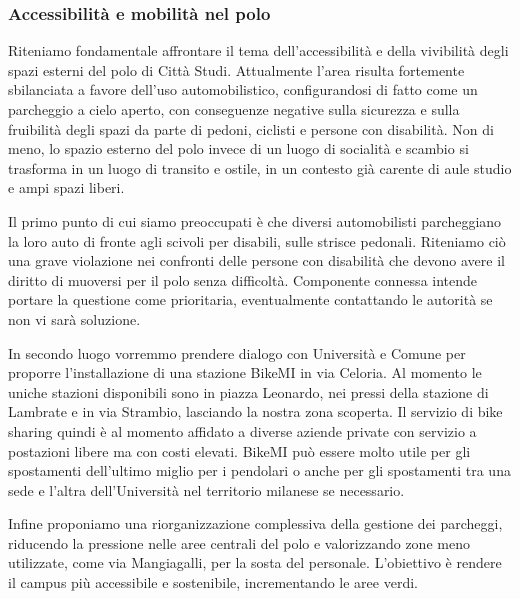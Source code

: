 \documentclass[12pt,a4paper]{article}
\begin{document}
\subsubsection{Accessibilità e mobilità nel polo}

Riteniamo fondamentale affrontare il tema dell’accessibilità e della vivibilità
degli spazi esterni del polo di Città Studi. Attualmente l’area risulta
fortemente sbilanciata a favore dell’uso automobilistico, configurandosi di
fatto come un parcheggio a cielo aperto, con conseguenze negative sulla
sicurezza e sulla fruibilità degli spazi da parte di pedoni, ciclisti e persone
con disabilità. Non di meno, lo spazio esterno del polo invece di un luogo di
socialità e scambio si trasforma in un luogo di transito e ostile, in un
contesto già carente di aule studio e ampi spazi liberi.

Il primo punto di cui siamo preoccupati è che diversi automobilisti parcheggiano
la loro auto di fronte agli scivoli per disabili, sulle strisce pedonali.
Riteniamo ciò una grave violazione nei confronti delle persone con disabilità
che devono avere il diritto di muoversi per il polo senza difficoltà. Componente
connessa intende portare la questione come prioritaria, eventualmente
contattando le autorità se non vi sarà soluzione.

In secondo luogo vorremmo prendere dialogo con Università e Comune per proporre
l'installazione di una stazione BikeMI in via Celoria. Al momento le uniche
stazioni disponibili sono in piazza Leonardo, nei pressi della stazione di
Lambrate e in via Strambio, lasciando la nostra zona scoperta. Il servizio di
bike sharing quindi è al momento affidato a diverse aziende private con servizio
a postazioni libere ma con costi elevati. BikeMI può essere molto utile per gli
spostamenti dell'ultimo miglio per i pendolari o anche per gli spostamenti tra
una sede e l'altra dell'Università nel territorio milanese se necessario.

Infine proponiamo una riorganizzazione complessiva della gestione dei parcheggi,
riducendo la pressione nelle aree centrali del polo e valorizzando zone meno
utilizzate, come via Mangiagalli, per la sosta del personale. L’obiettivo è
rendere il campus più accessibile e sostenibile, incrementando le aree verdi.
\end{document}
